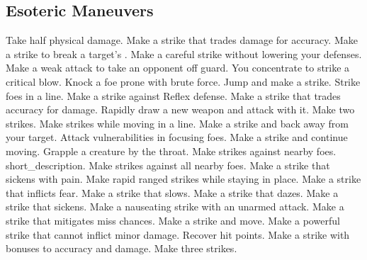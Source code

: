 
\small
\subsection{Esoteric Maneuvers}\label{Esoteric Maneuvers}
\begin{spelllist}
 Take half physical damage.
 Make a strike that trades damage for accuracy.
 Make a strike to break a target's .
 Make a careful strike without lowering your defenses.
 Make a weak attack to take an opponent off guard.
 You concentrate to strike a critical blow.
 Knock a foe prone with brute force.
 Jump and make a strike.
 Strike foes in a line.
 Make a strike against Reflex defense.
 Make a strike that trades accuracy for damage.
 Rapidly draw a new weapon and attack with it.
 Make two strikes.
 Make strikes while moving in a line.
 Make a strike and back away from your target.
 Attack vulnerabilities in focusing foes.
 Make a strike and continue moving.
 Grapple a creature by the throat.
 Make strikes against nearby foes.
 short_description.
 Make strikes against all nearby foes.
 Make a strike that sickens with pain.
 Make rapid ranged strikes while staying in place.
 Make a strike that inflicts fear.
 Make a strike that slows.
 Make a strike that dazes.
 Make a strike that sickens.
 Make a nauseating strike with an unarmed attack.
 Make a strike that mitigates miss chances.
 Make a strike and move.
 Make a powerful strike that cannot inflict minor damage.
 Recover hit points.
 Make a strike with bonuses to accuracy and damage.
 Make three strikes.
\end{spelllist}



